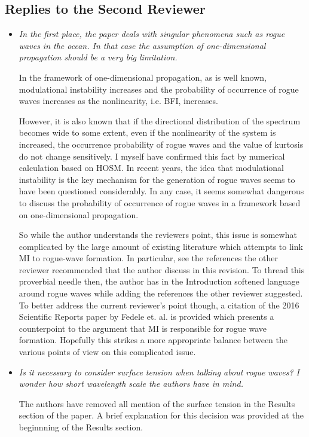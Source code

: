 \documentclass[a4paper,11pt]{article}
\begin{document}
\subsection*{Replies to the Second Reviewer}
\begin{itemize}
\item {\it In the first place, the paper deals with singular phenomena such as rogue waves in the ocean.
In that case the assumption of one-dimensional propagation should be a very big limitation.

In the framework of one-dimensional propagation, as is well known, modulational instability increases
and the probability of occurrence of rogue waves increases as the nonlinearity, i.e. BFI, increases.

However, it is also known that if the directional distribution of the spectrum becomes wide to some extent,
even if the nonlinearity of the system is increased, the occurrence probability of rogue waves and
the value of kurtosis do not change sensitively. I myself have confirmed this fact by numerical calculation based on HOSM.
In recent years, the idea that modulational instability is the key mechanism for the generation of rogue waves seems to have
been questioned considerably.
In any case, it seems somewhat dangerous to discuss the probability of occurrence of rogue waves in a framework
based on one-dimensional propagation.}

So while the author understands the reviewers point, this issue is somewhat complicated by the large amount of existing literature which attempts to link MI to rogue-wave formation.  In particular, see the references the other reviewer recommended that the author discuss in this revision.  To thread this proverbial needle then, the author has in the Introduction softened language around rogue waves while adding the references the other reviewer suggested.  To better address the current reviewer's point though, a citation of the 2016 Scientific Reports paper by Fedele et. al. is provided which presents a counterpoint to the argument that MI is responsible for rogue wave formation.  Hopefully this strikes a more appropriate balance between the various points of view on this complicated issue.  

\item {\it Is it necessary to consider surface tension when talking about rogue waves?
I wonder how short wavelength scale the authors have in mind.
}

The authors have removed all mention of the surface tension in the Results section of the paper.  A brief explanation for this decision was provided at the beginnning of the Results section.    


\end{itemize}
\end{document}
